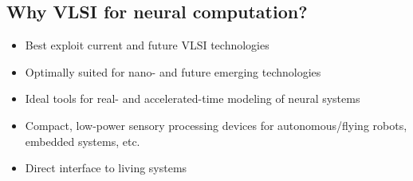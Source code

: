 \documentclass[english,11pt]{article}
\begin{document}
\subsection{Why VLSI for neural computation?} 
\begin{itemize}
\item Best exploit current and future VLSI technologies
\item Optimally suited for nano- and future emerging technologies
\item Ideal tools for real- and accelerated-time modeling of neural systems
\item Compact, low-power sensory processing devices for autonomous/flying robots, embedded systems, etc.
\item Direct interface to living systems
\end{itemize}
\end{document}
